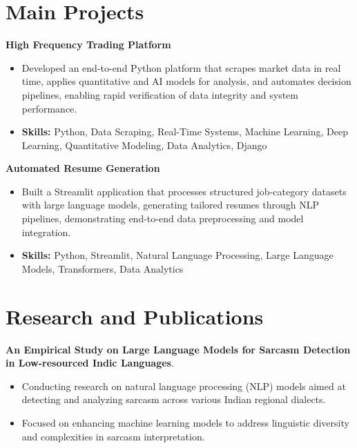 \documentclass[a4paper,11pt]{article}
\begin{document}
\section{\textbf{Main Projects}}

\vspace{1mm}
  \textbf{High Frequency Trading Platform  }
\vspace{-1.5mm} %
\begin{itemize}
  \item Developed an end-to-end Python platform that scrapes market data in real time, applies quantitative and AI models for analysis, and automates decision pipelines, enabling rapid verification of data integrity and system performance.
\vspace{-3mm}
  \item \textbf{Skills:} Python, Data Scraping, Real-Time Systems, Machine Learning, Deep Learning, Quantitative Modeling, Data Analytics, Django
\end{itemize}


\vspace{1mm}
   \textbf{Automated Resume Generation }
\vspace{-1.5mm} %
\begin{itemize}
  \item Built a Streamlit application that processes structured job-category datasets with large language models, generating tailored resumes through NLP pipelines, demonstrating end-to-end data preprocessing and model integration.
\vspace{-3mm}
  \item \textbf{Skills:} Python, Streamlit, Natural Language Processing, Large Language Models, Transformers, Data Analytics
\end{itemize}



\section{\textbf{Research and Publications} \hfill }
\vspace{1mm}
  \textbf{An Empirical Study on Large Language Models for Sarcasm Detection in Low-resourced Indic Languages}.
\vspace{-1mm} %
\begin{itemize}
  \item Conducting research on natural language processing (NLP) models aimed at detecting and analyzing sarcasm across various Indian regional dialects.
\vspace{-3mm}
  \item Focused on enhancing machine learning models to address linguistic diversity and complexities in sarcasm interpretation.
\end{itemize}
\end{document}
